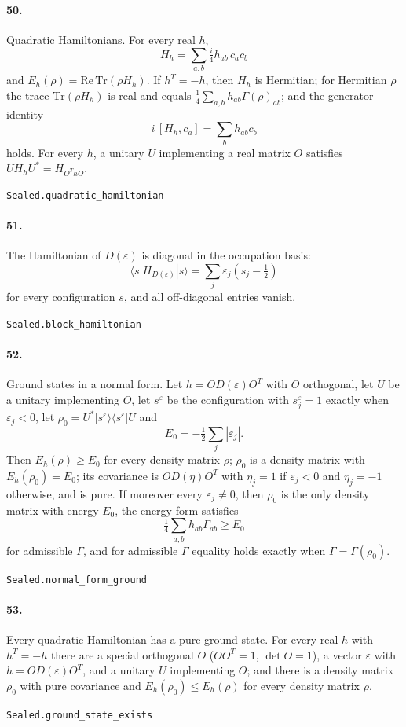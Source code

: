 \documentclass[11pt]{article}
\begin{document}
\paragraph{50.} Quadratic Hamiltonians. For every real $h$, \[H_h = \sum_{a,b} \tfrac i4 h_{ab}\, c_a c_b\] and $E_h(\rho) = \mathrm{Re}\,\mathrm{Tr}(\rho H_h)$. If $h^T = -h$, then $H_h$ is Hermitian; for Hermitian $\rho$ the trace $\mathrm{Tr}(\rho H_h)$ is real and equals $\tfrac14\sum_{a,b} h_{ab}\Gamma(\rho)_{ab}$; and the generator identity \[i\,[H_h, c_a] = \sum_b h_{ab} c_b\] holds. For every $h$, a unitary $U$ implementing a real matrix $O$ satisfies $U H_h U^* = H_{O^T h O}$.\par{\footnotesize\texttt{Sealed.quadratic\_hamiltonian}}

\paragraph{51.} The Hamiltonian of $D(\varepsilon)$ is diagonal in the occupation basis: \[\langle s|H_{D(\varepsilon)}|s\rangle = \sum_j \varepsilon_j (s_j - \tfrac12)\] for every configuration $s$, and all off-diagonal entries vanish.\par{\footnotesize\texttt{Sealed.block\_hamiltonian}}

\paragraph{52.} Ground states in a normal form. Let $h = O D(\varepsilon) O^T$ with $O$ orthogonal, let $U$ be a unitary implementing $O$, let $s^\varepsilon$ be the configuration with $s^\varepsilon_j = 1$ exactly when $\varepsilon_j < 0$, let $\rho_0 = U^* |s^\varepsilon\rangle\langle s^\varepsilon| U$ and \[E_0 = -\tfrac12\sum_j|\varepsilon_j|.\] Then $E_h(\rho) \ge E_0$ for every density matrix $\rho$; $\rho_0$ is a density matrix with $E_h(\rho_0) = E_0$; its covariance is $O D(\eta) O^T$ with $\eta_j = 1$ if $\varepsilon_j < 0$ and $\eta_j = -1$ otherwise, and is pure. If moreover every $\varepsilon_j \ne 0$, then $\rho_0$ is the only density matrix with energy $E_0$, the energy form satisfies \[\tfrac14\sum_{a,b} h_{ab}\Gamma_{ab} \ge E_0\] for admissible $\Gamma$, and for admissible $\Gamma$ equality holds exactly when $\Gamma = \Gamma(\rho_0)$.\par{\footnotesize\texttt{Sealed.normal\_form\_ground}}

\paragraph{53.} Every quadratic Hamiltonian has a pure ground state. For every real $h$ with $h^T = -h$ there are a special orthogonal $O$ ($O O^T = 1$, $\det O = 1$), a vector $\varepsilon$ with $h = O D(\varepsilon) O^T$, and a unitary $U$ implementing $O$; and there is a density matrix $\rho_0$ with pure covariance and $E_h(\rho_0) \le E_h(\rho)$ for every density matrix $\rho$.\par{\footnotesize\texttt{Sealed.ground\_state\_exists}}
\end{document}
